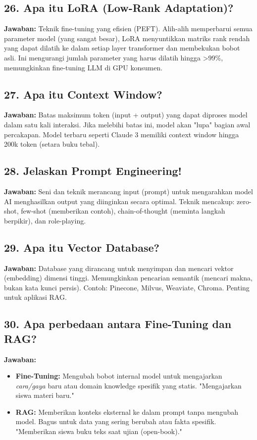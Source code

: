 \subsection{26. Apa itu LoRA (Low-Rank Adaptation)?}
\textbf{Jawaban:}
Teknik fine-tuning yang efisien (PEFT). Alih-alih memperbarui semua parameter model (yang sangat besar), LoRA menyuntikkan matriks rank rendah yang dapat dilatih ke dalam setiap layer transformer dan membekukan bobot asli. Ini mengurangi jumlah parameter yang harus dilatih hingga >99\%, memungkinkan fine-tuning LLM di GPU konsumen.

\subsection{27. Apa itu Context Window?}
\textbf{Jawaban:}
Batas maksimum token (input + output) yang dapat diproses model dalam satu kali interaksi. Jika melebihi batas ini, model akan "lupa" bagian awal percakapan. Model terbaru seperti Claude 3 memiliki context window hingga 200k token (setara buku tebal).

\subsection{28. Jelaskan Prompt Engineering!}
\textbf{Jawaban:}
Seni dan teknik merancang input (prompt) untuk mengarahkan model AI menghasilkan output yang diinginkan secara optimal. Teknik mencakup: zero-shot, few-shot (memberikan contoh), chain-of-thought (meminta langkah berpikir), dan role-playing.

\subsection{29. Apa itu Vector Database?}
\textbf{Jawaban:}
Database yang dirancang untuk menyimpan dan mencari vektor (embedding) dimensi tinggi. Memungkinkan pencarian semantik (mencari makna, bukan kata kunci persis). Contoh: Pinecone, Milvus, Weaviate, Chroma. Penting untuk aplikasi RAG.

\subsection{30. Apa perbedaan antara Fine-Tuning dan RAG?}
\textbf{Jawaban:}
\begin{itemize}
    \item \textbf{Fine-Tuning:} Mengubah bobot internal model untuk mengajarkan \textit{cara/gaya} baru atau domain knowledge spesifik yang statis. "Mengajarkan siswa materi baru."
    \item \textbf{RAG:} Memberikan konteks eksternal ke dalam prompt tanpa mengubah model. Bagus untuk data yang sering berubah atau fakta spesifik. "Memberikan siswa buku teks saat ujian (open-book)."
\end{itemize}

